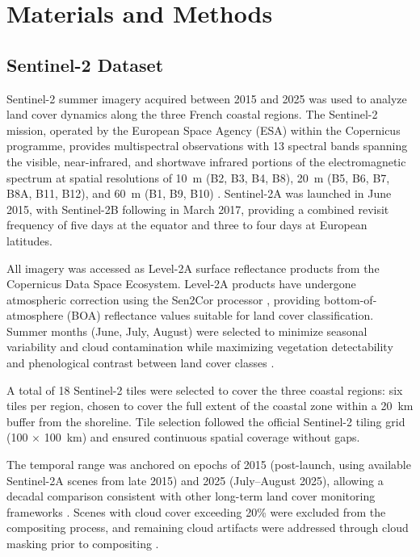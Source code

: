 \documentclass[remotesensing,article,submit,pdftex,moreauthors]{Definitions/mdpi}
\begin{document}
\section{Materials and Methods}

\subsection{Sentinel-2 Dataset}

Sentinel-2 summer imagery acquired between 2015 and 2025 was used to analyze land cover dynamics along the three French coastal regions. The Sentinel-2 mission, operated by the European Space Agency (ESA) within the Copernicus programme, provides multispectral observations with 13 spectral bands spanning the visible, near-infrared, and shortwave infrared portions of the electromagnetic spectrum at spatial resolutions of 10~m (B2, B3, B4, B8), 20~m (B5, B6, B7, B8A, B11, B12), and 60~m (B1, B9, B10) \citep{Drusch2012}. Sentinel-2A was launched in June 2015, with Sentinel-2B following in March 2017, providing a combined revisit frequency of five days at the equator and three to four days at European latitudes.

All imagery was accessed as Level-2A surface reflectance products from the Copernicus Data Space Ecosystem. Level-2A products have undergone atmospheric correction using the Sen2Cor processor \citep{Drusch2012}, providing bottom-of-atmosphere (BOA) reflectance values suitable for land cover classification. Summer months (June, July, August) were selected to minimize seasonal variability and cloud contamination while maximizing vegetation detectability and phenological contrast between land cover classes \citep{RF_Czechia2022, Yancheng2024}.

A total of 18 Sentinel-2 tiles were selected to cover the three coastal regions: six tiles per region, chosen to cover the full extent of the coastal zone within a 20~km buffer from the shoreline. Tile selection followed the official Sentinel-2 tiling grid (100 $\times$ 100~km) and ensured continuous spatial coverage without gaps. 

The temporal range was anchored on epochs of 2015 (post-launch, using available Sentinel-2A scenes from late 2015) and 2025 (July--August 2025), allowing a decadal comparison consistent with other long-term land cover monitoring frameworks \citep{Liu2023, Graffin2024}. Scenes with cloud cover exceeding 20\% were excluded from the compositing process, and remaining cloud artifacts were addressed through cloud masking prior to compositing \citep{Yancheng2024}.
\end{document}
